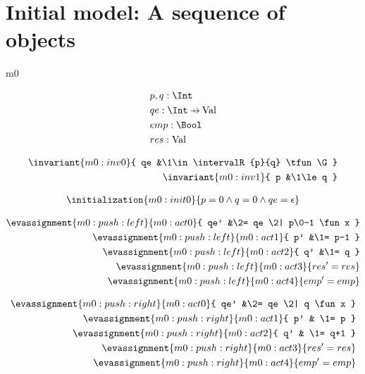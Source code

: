 \documentclass[12pt]{amsart}
\begin{document}
\section{Initial model: A sequence of objects}
\begin{machine}{m0}


\begin{align*}
& \variable{p,q : \Int } 
\\ & \variable{qe : \Int \pfun \G }
\\ & \variable{ emp : \Bool }
\\ & \variable{ res : \G }
\end{align*}

\begin{align*}
\invariant{m0:inv0}{ qe &\1\in \intervalR{p}{q} \tfun \G }
\\ \invariant{m0:inv1}{ p &\1\le q }
\end{align*}

\begin{align*}
\initialization{m0:init0}{p = 0 \land q = 0 \land qe = \emptyfun }
\end{align*}


\begin{align*}
\evassignment{m0:push:left}{m0:act0}{ qe' &\2= qe \2| p\0-1 \fun x }
\\ \evassignment{m0:push:left}{m0:act1}{ p' &\1= p-1 }
\\ \evassignment{m0:push:left}{m0:act2}{ q' &\1= q }
\\ \evassignment{m0:push:left}{m0:act3}{ res' = res }
\\ \evassignment{m0:push:left}{m0:act4}{ emp' = emp }
\end{align*}


\begin{align*}
\evassignment{m0:push:right}{m0:act0}{ qe' &\2= qe \2| q \fun x }
\\ \evassignment{m0:push:right}{m0:act1}{ p' & \1= p }
\\ \evassignment{m0:push:right}{m0:act2}{ q' & \1= q+1 }
\\ \evassignment{m0:push:right}{m0:act3}{ res' = res }
\\ \evassignment{m0:push:right}{m0:act4}{ emp' = emp }
\end{align*}


\end{machine}
\end{document}
